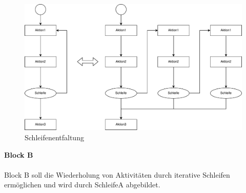 \documentclass{article}
\begin{document}
    \begin{figure}[H]
        \includegraphics[width=\linewidth]{./image/loop-unrolling.pdf}
        \caption{Schleifenentfaltung}
        \label{Schleifenentfaltung}
    \end{figure}
    \noindent
    \textbf{Block B}\\
    \\
    Block B soll die Wiederholung von Aktivitäten durch iterative Schleifen ermöglichen und wird durch SchleifeA abgebildet.
\end{document}
